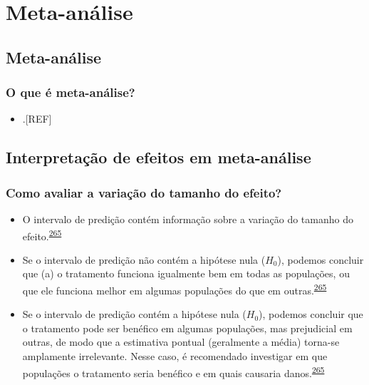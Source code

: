 \documentclass[
  a4paper,
]{book}
\providecommand{\tightlist}{%
  \setlength{\itemsep}{0pt}\setlength{\parskip}{0pt}}
\begin{document}
\hypertarget{meta-analise}{%
\chapter{\texorpdfstring{\textbf{Meta-análise}}{Meta-análise}}\label{meta-analise}}

\hypertarget{meta-analise}{%
\section{Meta-análise}\label{meta-analise}}

\hypertarget{o-que-uxe9-meta-anuxe1lise}{%
\subsection{O que é meta-análise?}\label{o-que-uxe9-meta-anuxe1lise}}

\begin{itemize}
\tightlist
\item
  .{[}REF{]}
\end{itemize}

\hypertarget{interpretacao}{%
\section{Interpretação de efeitos em meta-análise}\label{interpretacao}}

\hypertarget{como-avaliar-a-variauxe7uxe3o-do-tamanho-do-efeito}{%
\subsection{Como avaliar a variação do tamanho do efeito?}\label{como-avaliar-a-variauxe7uxe3o-do-tamanho-do-efeito}}

\begin{itemize}
\item
  O intervalo de predição contém informação sobre a variação do tamanho do efeito.\textsuperscript{\protect\hyperlink{ref-Borenstein2022}{265}}
\item
  Se o intervalo de predição não contém a hipótese nula (\(H_{0}\)), podemos concluir que (a) o tratamento funciona igualmente bem em todas as populações, ou que ele funciona melhor em algumas populações do que em outras.\textsuperscript{\protect\hyperlink{ref-Borenstein2022}{265}}
\item
  Se o intervalo de predição contém a hipótese nula (\(H_{0}\)), podemos concluir que o tratamento pode ser benéfico em algumas populações, mas prejudicial em outras, de modo que a estimativa pontual (geralmente a média) torna-se amplamente irrelevante. Nesse caso, é recomendado investigar em que populações o tratamento seria benéfico e em quais causaria danos.\textsuperscript{\protect\hyperlink{ref-Borenstein2022}{265}}
\end{itemize}
\end{document}
